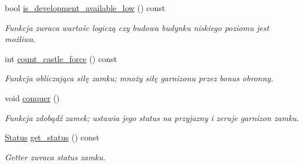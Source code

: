 \begin{DoxyCompactItemize}
\mbox{\label{classmodel_1_1Castle_a58687978e87a7a83d20093f250e04ad7}} 
bool \hyperlink{classmodel_1_1Castle_a58687978e87a7a83d20093f250e04ad7}{is\+\_\+development\+\_\+available\+\_\+low} () const
\begin{DoxyCompactList}\small\item\em Funkcja zwraca wartośc logiczą czy budowa budynku niskiego poziomu jest możliwa. \end{DoxyCompactList}\item 
\mbox{\label{classmodel_1_1Castle_ab1755d63a55a286002ef49b631b00d76}} 
int \hyperlink{classmodel_1_1Castle_ab1755d63a55a286002ef49b631b00d76}{count\+\_\+castle\+\_\+force} () const
\begin{DoxyCompactList}\small\item\em Funkcja obliczająca siłę zamku; mnoży siłę garnizonu przez bonus obronny. \end{DoxyCompactList}\item 
\mbox{\label{classmodel_1_1Castle_a3de598a4bb266b1d6d0920e0a53f7e35}} 
void \hyperlink{classmodel_1_1Castle_a3de598a4bb266b1d6d0920e0a53f7e35}{conquer} ()
\begin{DoxyCompactList}\small\item\em Funkcja zdobądź zamek; ustawia jego status na przyjazny i zeruje garnizon zamku. \end{DoxyCompactList}\item 
\mbox{\label{classmodel_1_1Castle_a74b526c24b8ac302c625b9c1162c9d25}} 
\hyperlink{status_8hpp_a822822ece62ee330ee656034849df887}{Status} \hyperlink{classmodel_1_1Castle_a74b526c24b8ac302c625b9c1162c9d25}{get\+\_\+status} () const
\begin{DoxyCompactList}\small\item\em Getter zwraca status zamku. \end{DoxyCompactList}\end{DoxyCompactItemize}
